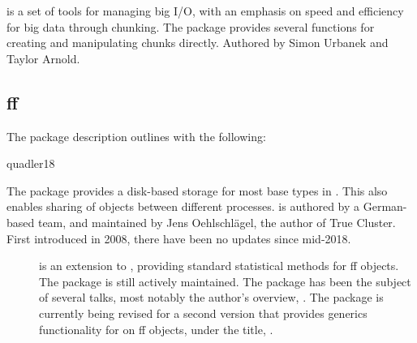  is a set of tools for managing big I/O, with an emphasis on
speed and efficiency for big data through chunking\cite{urbanek20b}. The
package provides several functions for creating and manipulating chunks
directly. Authored by Simon Urbanek and Taylor Arnold.

\subsection{ff}\label{subsec:ff}

The package description outlines  with the following:

qu{adler18}

The package provides a disk-based storage for most base types in \R. This
also enables sharing of objects between different \R processes.  is
authored by a German-based team, and maintained by Jens Oehlschlägel,
the author of True Cluster. First introduced in
2008\cite{adler08:_large_r}, there have been no updates since
mid-2018.

\begin{description}
\item[\cite{jonge20}]
        is an extension to , providing standard statistical methods for ff
        objects. The package is still actively maintained. The package has been
        the subject of several talks, most notably the author's overview,
        \cite{wijffels13}. The package is currently being revised for a second
        version that provides generics functionality for  on ff objects,
        under the title, \cite{jonge15}.
\end{description}
